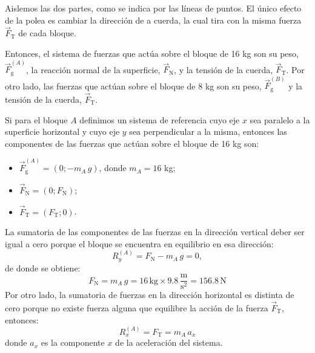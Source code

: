 \documentclass[addpoints]{exam}
\begin{document}
\begin{questions}
    \begin{solution}
        Aislemos las dos partes, como se indica por las líneas de puntos. El único efecto de la polea es cambiar la dirección de a cuerda, la cual tira con la misma fuerza $\vec{F}_\text{T}$ de cada bloque.

        Entonces, el sistema de fuerzas que actúa sobre el bloque de 16 kg son su peso, $\vec{F}_\text{g}^{(A)}$, la reacción normal de la superficie, $\vec{F}_\text{N}$, y la tensión de la cuerda, $\vec{F}_\text{T}$. Por otro lado, las fuerzas que actúan sobre el bloque de 8 kg son su peso, $\vec{F}_\text{g}^{(B)}$ y la tensión de la cuerda, $\vec{F}_\text{T}$.

        Si para el bloque $A$ definimos un sistema de referencia cuyo eje $x$ sea paralelo a la superficie horizontal y cuyo eje $y$ sea perpendicular a la misma, entonces las componentes de las fuerzas que actúan sobre el bloque de 16 kg son:
        \begin{itemize}
            \item $\vec{F}_\text{g}^{(A)} = \left(0; - m_A \, g\right)$, donde $m_A = 16$ kg;
            \item $\vec{F}_\text{N} = \left(0; F_\text{N}\right)$;
            \item $\vec{F}_\text{T} = \left(F_\text{T};0\right)$.
        \end{itemize}
        La sumatoria de las componentes de las fuerzas en la dirección vertical deber ser igual a cero porque el bloque se encuentra en equilibrio en esa dirección: $$R_y^{(A)} = F_\text{N} - m_A \, g = 0,$$ de donde se obtiene: $$F_\text{N} = m_A \, g = 16 \, \text{kg} \times 9.8 \, \frac{\text{m}}{\text{s}^2} = 156.8 \, \text{N}$$ Por otro lado, la sumatoria de fuerzas en la dirección horizontal es distinta de cero porque no existe fuerza alguna que equilibre la acción de la fuerza $\vec{F}_\text{T}$, entonces: 
        \begin{equation}
            \label{ec:RxA_vinculados2}
            R_x^{(A)} = F_\text{T} = m_A \, a_x
        \end{equation} donde $a_x$ es la componente $x$ de la aceleración del sistema.


\end{solution}
\end{questions}
\end{document}
